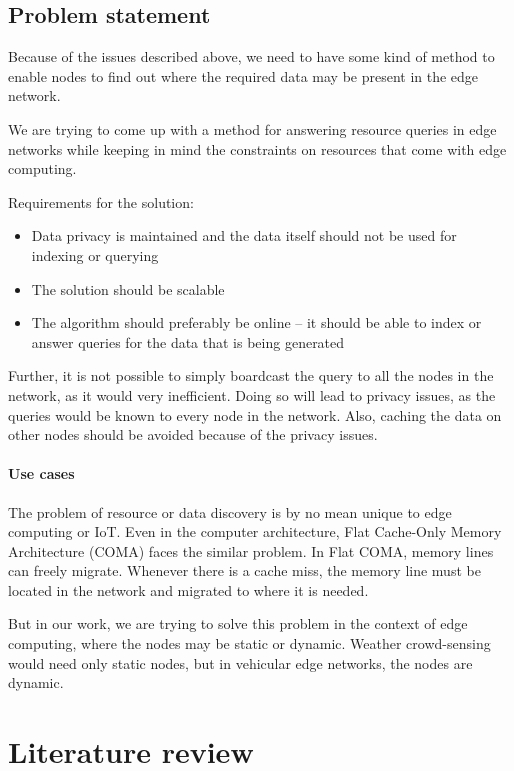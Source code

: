 \section{Problem statement}

Because of the issues described above, we need to have some kind of method to
enable nodes to find out where the required data may be present in the edge
network.

We are trying to come up with a method for answering resource queries in edge
networks while keeping in mind the constraints on resources that come with edge
computing.

Requirements for the solution:
\begin{itemize}
      \item Data privacy is maintained and the data itself should not be used
            for indexing or querying
      \item The solution should be scalable
      \item The algorithm should preferably be online -- it should be able to
            index or answer queries for the data that is being generated
\end{itemize}

Further, it is not possible to simply boardcast the query to all the nodes in
the network, as it would very inefficient. Doing so will lead to privacy issues, as
the queries would be known to every node in the network. Also, caching the data
on other nodes should be avoided because of the privacy issues.

\subsubsection{Use cases}

The problem of resource or data discovery is by no mean unique to edge computing
or IoT. Even in the computer architecture, Flat Cache-Only Memory Architecture
(COMA) faces the similar problem. In Flat COMA, memory lines can freely migrate.
Whenever there is a cache miss, the memory line must be located in the network and
migrated to where it is needed.
\cite{joseptorrellasCacheOnlyMemoryArchitecture}

But in our work, we are trying to solve this problem in the context of edge
computing, where the nodes may be static or dynamic. Weather crowd-sensing would
need only static nodes, but in vehicular edge networks, the nodes are dynamic.


\chapter{Literature review}

